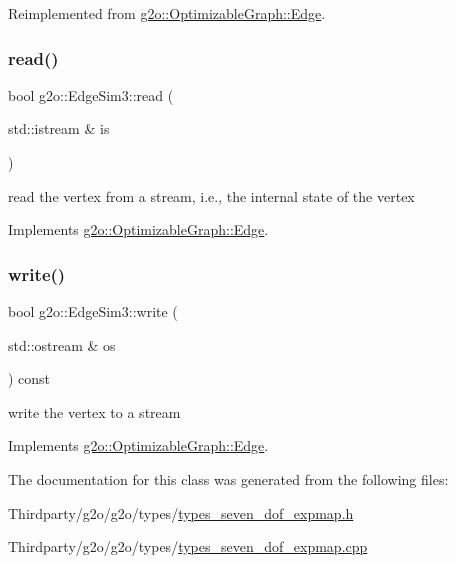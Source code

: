 Reimplemented from \mbox{\hyperlink{classg2o_1_1_optimizable_graph_1_1_edge_a1cef6ffa0f82f1ad3dd3d7a9f04425ee}{g2o\+::\+Optimizable\+Graph\+::\+Edge}}.

\mbox{\label{classg2o_1_1_edge_sim3_a6c7ad669fa04265475cbfdba3452fcbd}} 
\subsubsection{\texorpdfstring{read()}{read()}}
{\footnotesize\ttfamily bool g2o\+::\+Edge\+Sim3\+::read (\begin{DoxyParamCaption}\item[{std\+::istream \&}]{is }\end{DoxyParamCaption})\hspace{0.3cm}{\ttfamily [virtual]}}



read the vertex from a stream, i.\+e., the internal state of the vertex 



Implements \mbox{\hyperlink{classg2o_1_1_optimizable_graph_1_1_edge_a30cf69b762a06aa35e796d8af71632b0}{g2o\+::\+Optimizable\+Graph\+::\+Edge}}.

\mbox{\label{classg2o_1_1_edge_sim3_ae1f72205352bf73156b70080ecfa235b}} 
\subsubsection{\texorpdfstring{write()}{write()}}
{\footnotesize\ttfamily bool g2o\+::\+Edge\+Sim3\+::write (\begin{DoxyParamCaption}\item[{std\+::ostream \&}]{os }\end{DoxyParamCaption}) const\hspace{0.3cm}{\ttfamily [virtual]}}



write the vertex to a stream 



Implements \mbox{\hyperlink{classg2o_1_1_optimizable_graph_1_1_edge_a804b9a2178249b9297c55b8fbbeda56e}{g2o\+::\+Optimizable\+Graph\+::\+Edge}}.



The documentation for this class was generated from the following files\+:\begin{DoxyCompactItemize}
\item 
Thirdparty/g2o/g2o/types/\mbox{\hyperlink{types__seven__dof__expmap_8h}{types\+\_\+seven\+\_\+dof\+\_\+expmap.\+h}}\item 
Thirdparty/g2o/g2o/types/\mbox{\hyperlink{types__seven__dof__expmap_8cpp}{types\+\_\+seven\+\_\+dof\+\_\+expmap.\+cpp}}\end{DoxyCompactItemize}
